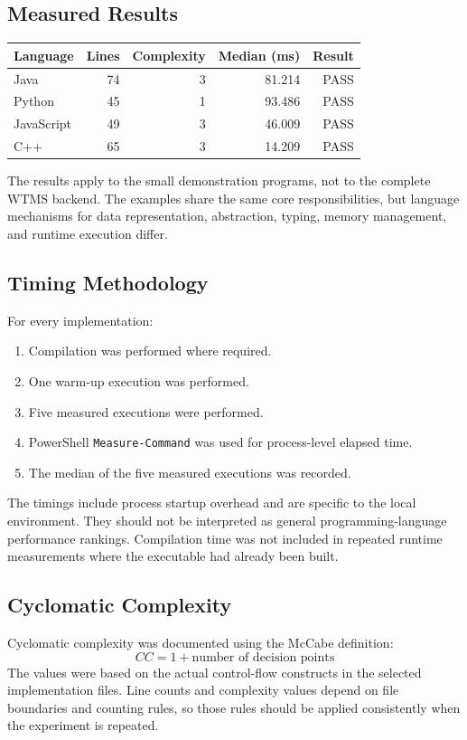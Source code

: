 \documentclass[12pt,a4paper]{article}
\begin{document}
\subsection{Measured Results}
\begin{center}
\begin{tabular}{lrrrr}
\toprule
Language & Lines & Complexity & Median (ms) & Result\\
\midrule
Java & 74 & 3 & 81.214 & PASS\\
Python & 45 & 1 & 93.486 & PASS\\
JavaScript & 49 & 3 & 46.009 & PASS\\
C++ & 65 & 3 & 14.209 & PASS\\
\bottomrule
\end{tabular}
\end{center}

The results apply to the small demonstration programs, not to the complete WTMS backend. The examples share the same core responsibilities, but language mechanisms for data representation, abstraction, typing, memory management, and runtime execution differ.

\subsection{Timing Methodology}
For every implementation:
\begin{enumerate}
    \item Compilation was performed where required.
    \item One warm-up execution was performed.
    \item Five measured executions were performed.
    \item PowerShell \texttt{Measure-Command} was used for process-level elapsed time.
    \item The median of the five measured executions was recorded.
\end{enumerate}

The timings include process startup overhead and are specific to the local environment. They should not be interpreted as general programming-language performance rankings. Compilation time was not included in repeated runtime measurements where the executable had already been built.

\subsection{Cyclomatic Complexity}
Cyclomatic complexity was documented using the McCabe definition:
\[
CC = 1 + \text{number of decision points}
\]
The values were based on the actual control-flow constructs in the selected implementation files. Line counts and complexity values depend on file boundaries and counting rules, so those rules should be applied consistently when the experiment is repeated.
\end{document}
